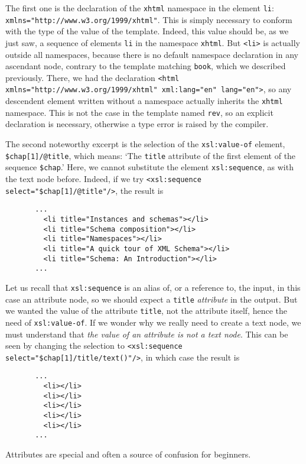 The first one is the declaration of the \texttt{xhtml} namespace in
the element \texttt{li}:
\texttt{xmlns="http://www.w3.org/1999/xhtml"}. This is simply
necessary to conform with the type of the value of the
template. Indeed, this value should be, as we just saw, a sequence of
elements \texttt{li} in the namespace \texttt{xhtml}. But
\texttt{<li>} is actually outside all namespaces, because there is no
default namespace declaration in any ascendant node, contrary to the
template matching \texttt{book}, which we described previously. There,
we had the declaration \texttt{<html
  xmlns="http://www.w3.org/1999/xhtml" xml:lang="en" lang="en">}, so
any descendent element written without a namespace actually
inherits the \texttt{xhtml} namespace. This is not the case in the
template named \texttt{rev}, so an explicit declaration is necessary,
otherwise a type error is raised by the \XSLT compiler.

The second noteworthy excerpt is the selection of the
\texttt{xsl:value-of} element, \texttt{\$chap[1]/@title}, which means:
`The \texttt{title} attribute of the first element of the sequence
\texttt{\$chap}.' Here, we cannot substitute the element
\texttt{xsl:sequence}, as with the text node before. Indeed, if we try
\texttt{<xsl:sequence select="\$chap[1]/@title"/>}, the result is 
\begin{verbatim}
       ...
         <li title="Instances and schemas"></li>
         <li title="Schema composition"></li>
         <li title="Namespaces"></li>
         <li title="A quick tour of XML Schema"></li>
         <li title="Schema: An Introduction"></li>
       ...
\end{verbatim}
Let us recall that \texttt{xsl:sequence} is an alias of, or a
reference to, the input, in this case an attribute node, so we should
expect a \texttt{title} \emph{attribute} in the output. But we wanted
the value of the attribute \texttt{title}, not the attribute itself,
hence the need of \texttt{xsl:value-of}. If we wonder why we really
need to create a text node, we must understand that \emph{the value of
  an attribute is not a text node}. This can be seen by changing the
selection to \texttt{<xsl:sequence select="\$chap[1]/title/text()"/>},
in which case the result is
\begin{verbatim}
       ...
         <li></li>
         <li></li>
         <li></li>
         <li></li>
         <li></li>
       ...
\end{verbatim}
Attributes are special and often a source of confusion for beginners.

